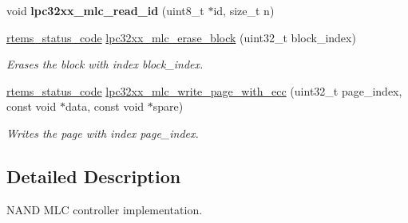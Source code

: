 \begin{DoxyCompactItemize}
void {\bfseries lpc32xx\+\_\+mlc\+\_\+read\+\_\+id} (uint8\+\_\+t $\ast$id, size\+\_\+t n)
\item 
\mbox{\hyperlink{group__ClassicStatus_ga545d41846817eaba6143d52ee4d9e9fe}{rtems\+\_\+status\+\_\+code}} \mbox{\hyperlink{group__lpc32xx__nand__mlc_ga602a6e700d0e763ba5ca98874b92f926}{lpc32xx\+\_\+mlc\+\_\+erase\+\_\+block}} (uint32\+\_\+t block\+\_\+index)
\begin{DoxyCompactList}\small\item\em Erases the block with index {\itshape block\+\_\+index}. \end{DoxyCompactList}\item 
\mbox{\hyperlink{group__ClassicStatus_ga545d41846817eaba6143d52ee4d9e9fe}{rtems\+\_\+status\+\_\+code}} \mbox{\hyperlink{group__lpc32xx__nand__mlc_ga3e7231705d7d840e2e71fbb64534b2f0}{lpc32xx\+\_\+mlc\+\_\+write\+\_\+page\+\_\+with\+\_\+ecc}} (uint32\+\_\+t page\+\_\+index, const void $\ast$data, const void $\ast$spare)
\begin{DoxyCompactList}\small\item\em Writes the page with index {\itshape page\+\_\+index}. \end{DoxyCompactList}\end{DoxyCompactItemize}


\subsection{Detailed Description}
N\+A\+ND M\+LC controller implementation. 

